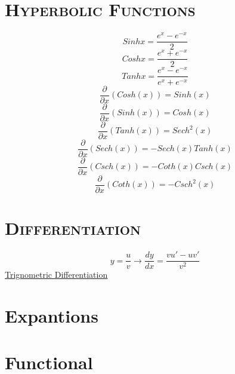 \documentclass[fleqn, 14pt]{extarticle} %
\begin{document}
\section{\textsc{Hyperbolic Functions}}
\begin{equation}Sinh x= \frac{e^x-e^{-x}}{2}
\end{equation}
\begin{equation}
Cosh x= \frac{e^x+e^{-x}}{2} 
\end{equation}
\begin{equation}
Tanh x= \frac{e^x-e^{-x}}{e^x+e^{-x}}
\end{equation}
\begin{equation}
	\frac{\partial }{\partial x}(Cosh(x))=Sinh(x)
\end{equation}
\begin{equation}
	\frac{\partial }{\partial x}(Sinh(x))=Cosh(x)
\end{equation}
\begin{equation}
	\frac{\partial }{\partial x}(Tanh(x))=Sech^2 (x)
\end{equation}
\begin{equation}
	\frac{\partial }{\partial x}(Sech(x))=-Sech(x)Tanh(x)
\end{equation}
\begin{equation}
	\frac{\partial }{\partial x}(Csch(x))=-Coth(x)Csch(x)
\end{equation}
\begin{equation}
	\frac{\partial }{\partial x}(Coth(x))=-Csch^2(x)
\end{equation}
\section{\textsc{Differentiation}}
\begin{equation}
	y=\frac{u}{v}   \longrightarrow \frac{dy}{dx}=\frac{v u'-u v'}{v^2}
\end{equation}
\hyperref[dtri]{\underline{Trignometric Differentiation}}


\section{Expantions}
	 
\section{Functional}
\end{document}

